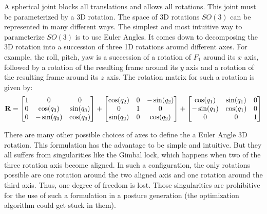 A spherical joint blocks all translations and allows all rotations. This joint must be parameterized by a 3D rotation. The space of 3D rotations $SO(3)$ can be represented in many different ways.
The simplest and most intuitive way to parameterize $SO(3)$ is to use Euler Angles.
It comes down to decomposing the 3D rotation into a succession of three 1D rotations around different axes.
For example, the roll, pitch, yaw is a succession of a rotation of $F_1$ around its $x$ axis, followed by a rotation of the resulting frame around its $y$ axis and a rotation of the resulting frame around its $z$ axis.
The rotation matrix for such a rotation is given by:
\begin{equation}
  {\bf R} =
  \begin{bmatrix}
    1 & 0 & 0 \\
    0 & \cos(q_3) & \sin(q_3) \\
    0 & -\sin(q_3) & \cos(q_3) \\
  \end{bmatrix}
  +
  \begin{bmatrix}
    \cos(q_2) & 0 & -\sin(q_2) \\
    0 & 1 & 0 \\
    \sin(q_2) & 0 & \cos(q_2) \\
  \end{bmatrix}
  +
  \begin{bmatrix}
    \cos(q_1) & \sin(q_1) & 0 \\
    -\sin(q_1) & \cos(q_1) & 0 \\
    0 & 0 & 1
  \end{bmatrix}
\end{equation}

There are many other possible choices of axes to define the a Euler Angle 3D rotation.
This formulation has the advantage to be simple and intuitive.
But they all suffers from singularities like the Gimbal lock, which happens when two of the three rotation axis become aligned.
In such a configuration, the only rotations possible are one rotation around the two aligned axis and one rotation around the third axis.
Thus, one degree of freedom is lost.
Those singularities are prohibitive for the use of such a formulation in a posture generation (the optimization algorithm could get stuck in them).

